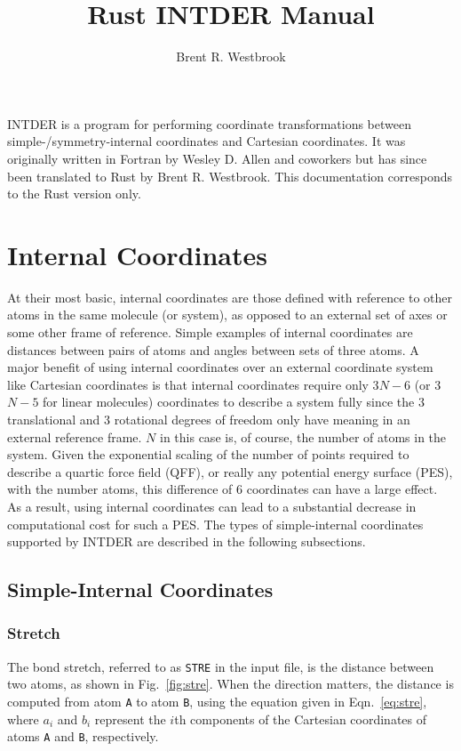 \documentclass{article}
\title{Rust INTDER Manual}
\date{}
\author{Brent R. Westbrook}
\begin{document}
\maketitle

INTDER is a program for performing coordinate transformations between
simple-/symmetry-internal coordinates and Cartesian coordinates. It was
originally written in Fortran by Wesley D. Allen and coworkers but has since
been translated to Rust by Brent R. Westbrook. This documentation corresponds to
the Rust version only.

\section{Internal Coordinates}
\label{sec:coords}

At their most basic, internal coordinates are those defined with reference to
other atoms in the same molecule (or system), as opposed to an external set of
axes or some other frame of reference. Simple examples of internal coordinates
are distances between pairs of atoms and angles between sets of three atoms. A
major benefit of using internal coordinates over an external coordinate system
like Cartesian coordinates is that internal coordinates require only 3$N-6$ (or
3$N-5$ for linear molecules) coordinates to describe a system fully since the 3
translational and 3 rotational degrees of freedom only have meaning in an
external reference frame. $N$ in this case is, of course, the number of atoms in
the system. Given the exponential scaling of the number of points required to
describe a quartic force field (QFF), or really any potential energy surface
(PES), with the number atoms, this difference of 6 coordinates can have a large
effect. As a result, using internal coordinates can lead to a substantial
decrease in computational cost for such a PES. The types of simple-internal
coordinates supported by INTDER are described in the following subsections.

\subsection{Simple-Internal Coordinates}
\label{sec:simple}

\subsubsection{Stretch}
\label{sec:stretch}

The bond stretch, referred to as \verb|STRE| in the input file, is the distance
between two atoms, as shown in Fig.~\ref{fig:stre}. When the direction matters,
the distance is computed from atom \verb|A| to atom \verb|B|, using the equation
given in Eqn.~\ref{eq:stre}, where $a_i$ and $b_i$ represent the $i$th
components of the Cartesian coordinates of atoms \verb|A| and \verb|B|,
respectively.
\end{document}
